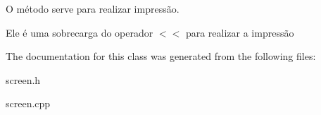 O método serve para realizar impressão. 

Ele é uma sobrecarga do operador $<$$<$ para realizar a impressão 

The documentation for this class was generated from the following files\+:\begin{DoxyCompactItemize}
\item 
screen.\+h\item 
screen.\+cpp\end{DoxyCompactItemize}
